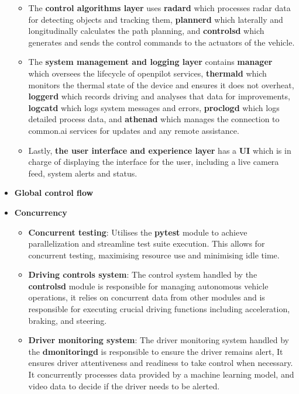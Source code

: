 \documentclass[12pt]{article}
\begin{document}
\begin{itemize}
\begin{itemize}
        \item The \textbf{control algorithms layer} uses \textbf{radard} which processes radar data for detecting objects and tracking them, \textbf{plannerd} which laterally and longitudinally calculates the path planning, and \textbf{controlsd} which generates and sends the control commands to the actuators of the vehicle.

        \item The \textbf{system management and logging layer} contains \textbf{manager} which oversees the lifecycle of openpilot services, \textbf{thermald} which monitors the thermal state of the device and ensures it does not overheat, \textbf{loggerd} which records driving and analyses that data for improvements, \textbf{logcatd} which logs system messages and errors, \textbf{proclogd} which logs detailed process data, and \textbf{athenad} which manages the connection to common.ai services for updates and any remote assistance.
        
        \item Lastly, \textbf{the user interface and experience layer} has a \textbf{UI} which is in charge of displaying the interface for the user, including a live camera feed, system alerts and status.  
    \end{itemize}

    \item \textbf{Global control flow} %
    
    \item \textbf{Concurrency}
    \begin{itemize}
        \item \textbf{Concurrent testing}: Utilises the \textbf{pytest} module to achieve parallelization and streamline test suite execution. This allows for concurrent testing, maximising resource use and minimising idle time. 
        \item \textbf{Driving controls system}: The control system handled by the \textbf{controlsd} module is responsible for managing autonomous vehicle operations, it relies on concurrent data from other modules and is responsible for executing crucial driving functions including acceleration, braking, and steering.
        \item \textbf{Driver monitoring system}: The driver monitoring system handled by the \textbf{dmonitoringd} is responsible to ensure the driver remains alert, It ensures driver attentiveness and readiness to take control when necessary. It concurrently processes data provided by a machine learning model, and video data to decide if the driver needs to be alerted.

    \end{itemize}

\end{itemize}
\end{document}
